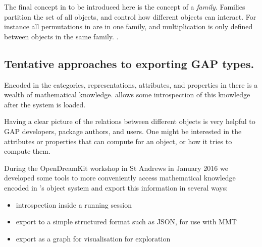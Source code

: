 The final concept in \GAP to be introduced here is the concept of a \emph{family}.
Families partition the set of all objects, and control how different objects can
interact. For instance all permutations in \GAP are in one family, and multiplication
is only defined between objects in the same family.
.




\subsection{Tentative approaches to exporting GAP types.}\label{gap-types-export}

Encoded in the categories, representations, attributes, and properties in \GAP
there is a wealth of mathematical knowledge. \GAP allows some introspection
of this knowledge after the system is loaded.

Having a clear picture of the relations between different objects is 
very helpful to GAP developers, package authors, and users. One might 
be interested in the attributes or properties that \GAP can compute for
an object, or how it tries to compute them.

During the OpenDreamKit workshop in St Andrews in January 2016 we developed some
tools to more conveniently access mathematical knowledge encoded in \GAP's object
system and export this information in several ways:
\begin{itemize}
\item introspection inside a running \GAP session
\item export to a simple structured format such as JSON, for use with MMT
\item export as a graph for visualisation for exploration
\end{itemize}

